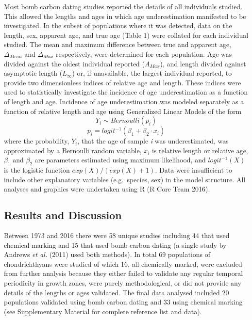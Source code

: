 \documentclass[]{article}
\begin{document}
Most bomb carbon dating studies reported the details of all individuals
studied. This allowed the lengths and ages in which age underestimation
manifested to be investigated. In the subset of populations where it was
detected, data on the length, sex, apparent age, and true age (Table 1)
were collated for each individual studied. The mean and maximum
difference between true and apparent age, \(\Delta_{Mean}\) and
\(\Delta_{Max}\) respectively, were determined for each population. Age
was divided against the oldest individual reported (\(A_{Max}\)), and
length divided against asymptotic length (\(L_\infty\)) or, if
unavailable, the largest individual reported, to provide two
dimensionless indices of relative age and length. These indices were
used to statistically investigate the incidence of age underestimation
as a function of length and age. Incidence of age underestimation was
modeled separately as a function of relative length and age using
Generalized Linear Models of the form \[Y_i\sim Bernoulli(p_i)\]
\[p_i=logit^{-1}\left (\beta_1+\beta_2\cdot  x_i  \right )\] where the
probability, \(Y_i\), that the age of sample \emph{i} was
underestimated, was approximated by a Bernoulli random variable, \(x_i\)
is relative length or relative age, \(\beta_1\) and \(\beta_2\) are
parameters estimated using maximum likelihood, and \(logit^{-1}(X)\) is
the logistic function \(exp(X)/(exp(X)+1)\). Data were insufficient to
include other explanatory variables (e.g.~species, sex) in the model
structure. All analyses and graphics were undertaken using R (R Core
Team 2016).

\subsection{Results and Discussion}\label{results-and-discussion}

Between 1973 and 2016 there were 58 unique studies including 44 that
used chemical marking and 15 that used bomb carbon dating (a single
study by Andrews \emph{et al.} (2011) used both methods). In total 69
populations of chondrichthyans were studied of which 16, all chemically
marked, were excluded from further analysis because they either failed
to validate any regular temporal periodicity in growth zones, were
purely methodological, or did not provide any details of the lengths or
ages validated. The final data analysed included 20 populations
validated using bomb carbon dating and 33 using chemical marking (see
Supplementary Material for complete reference list and data).
\end{document}
